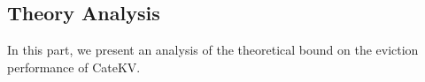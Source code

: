 % 


\subsection{Theory Analysis}
In this part, we present an analysis of the theoretical bound on the eviction performance of CateKV.

